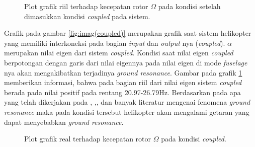 \begin{figure}[H]
	\centering
	\caption{Plot grafik riil terhadap kecepatan rotor $\Omega$ pada kondisi setelah dimasukkan kondisi \textit{coupled} pada sistem.}
	\label{fig:real(coupled)}
\end{figure}

Grafik pada gambar \ref{fig:imag(coupled)} merupakan grafik saat sistem helikopter yang memiliki interkoneksi pada bagian \textit{input} dan \textit{output} nya (\textit{coupled}). $\alpha$ merupakan nilai eigen dari sistem \textit{coupled}. Kondisi saat nilai eigen \textit{coupled} berpotongan dengan garis dari nilai eigennya pada nilai eigen di mode \textit{fuselage} nya akan mengakibatkan terjadinya \textit{ground resonance}. Gambar pada grafik \ref{fig:real(coupled)} memberikan informasi, bahwa pada bagian riil dari nilai eigen sistem \textit{coupled} berada pada nilai positif pada rentang 20.97-26.79Hz. Berdasarkan pada apa yang telah dikerjakan pada \cite{BERGEOT201672}, \cite{Eckert2007AnalyticalAA},\cite{Bergeot_passive}, dan banyak literatur mengenai fenomena \textit{ground resonance} maka pada kondisi tersebut helikopter akan mengalami getaran yang dapat menyebabkan \textit{ground resonance}. 

\begin{figure}[H]
	\centering
	\caption{Plot grafik real terhadap kecepatan rotor $\Omega$ pada kondisi \textit{coupled}.}
	\label{fig:resonance_range}
\end{figure}

